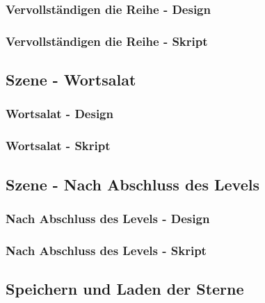 \subsubsection{Vervollständigen die Reihe - Design}
\subsubsection{Vervollständigen die Reihe - Skript}
\subsection{Szene - Wortsalat}
\subsubsection{Wortsalat - Design}
\subsubsection{Wortsalat - Skript}
\subsection{Szene - Nach Abschluss des Levels}
\subsubsection{Nach Abschluss des Levels - Design}
\subsubsection{Nach Abschluss des Levels - Skript}
\subsection{Speichern und Laden der Sterne}
